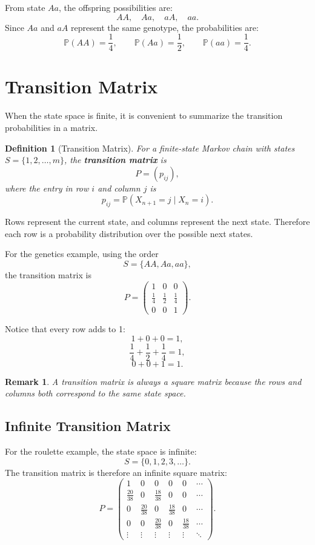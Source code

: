 \documentclass[12pt,a4paper]{article}
\theoremstyle{lecturestyle}
\newtheorem{definition}{Definition}
\newtheorem{remark}{Remark}
\newcommand{\Prob}{\mathbb{P}}
\begin{document}
From state $Aa$, the offspring possibilities are:
\[
AA,\quad Aa,\quad aA,\quad aa.
\]
Since $Aa$ and $aA$ represent the same genotype, the probabilities are:
\[
\Prob(AA)=\frac14,\qquad
\Prob(Aa)=\frac12,\qquad
\Prob(aa)=\frac14.
\]

\section{Transition Matrix}

When the state space is finite, it is convenient to summarize the transition probabilities in a matrix.

\begin{definition}[Transition Matrix]
For a finite-state Markov chain with states $S=\{1,2,\ldots,m\}$, the \textbf{transition matrix} is
\[
P=(p_{ij}),
\]
where the entry in row $i$ and column $j$ is
\[
p_{ij}=\Prob(X_{n+1}=j\mid X_n=i).
\]
\end{definition}

Rows represent the current state, and columns represent the next state. Therefore each row is a probability distribution over the possible next states.

For the genetics example, using the order
\[
S=\{AA,Aa,aa\},
\]
the transition matrix is
\[
P=
\begin{pmatrix}
1 & 0 & 0\\
\frac14 & \frac12 & \frac14\\
0 & 0 & 1
\end{pmatrix}.
\]

Notice that every row adds to 1:
\[
1+0+0=1,
\]
\[
\frac14+\frac12+\frac14=1,
\]
\[
0+0+1=1.
\]

\begin{remark}
A transition matrix is always a square matrix because the rows and columns both correspond to the same state space.
\end{remark}

\subsection{Infinite Transition Matrix}

For the roulette example, the state space is infinite:
\[
S=\{0,1,2,3,\ldots\}.
\]
The transition matrix is therefore an infinite square matrix:
\[
P=
\begin{pmatrix}
1 & 0 & 0 & 0 & 0 & \cdots\\
\frac{20}{38} & 0 & \frac{18}{38} & 0 & 0 & \cdots\\
0 & \frac{20}{38} & 0 & \frac{18}{38} & 0 & \cdots\\
0 & 0 & \frac{20}{38} & 0 & \frac{18}{38} & \cdots\\
\vdots & \vdots & \vdots & \vdots & \vdots & \ddots
\end{pmatrix}.
\]
\end{document}
